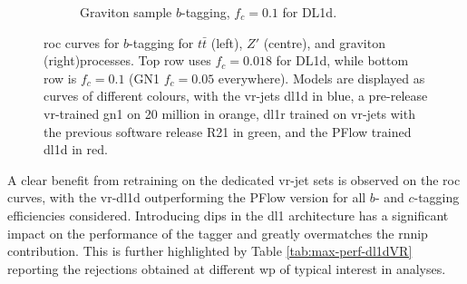 \begin{figure}
\begin{subfigure}[t]{0.3\textwidth}
    \caption{Graviton sample $b$-tagging, $f_c = 0.1$ for DL1d.}
    \label{fig:dl1dVRROCgrc}
  \end{subfigure}
  \caption{\gls{roc} curves for $b$-tagging for $t\bar{t}$ (left), $Z'$ (centre), and graviton (right)processes. Top row uses $f_c = 0.018$ for DL1d, while bottom row is $f_c = 0.1$ (GN1 $f_c = 0.05$ everywhere). Models are displayed as curves of different colours, with the \gls{vr}-jets \gls{dl1d} in blue, a pre-release \gls{vr}-trained \gls{gn1} on 20 million in orange, \gls{dl1r} trained on \gls{vr}-jets with the previous software release R21 in green, and the PFlow trained \gls{dl1d} in red.}
  \label{fig:dl1dVRROC}
\end{figure}

A clear benefit from retraining on the dedicated \gls{vr}-jet sets is observed on the \gls{roc} curves, with the \gls{vr}-\gls{dl1d} outperforming the PFlow version for all $b$- and $c$-tagging efficiencies considered. Introducing \gls{dips} in the \gls{dl1} architecture has a significant impact on the performance of the tagger and greatly overmatches the \gls{rnnip} contribution. This is further highlighted by Table \ref{tab:max-perf-dl1dVR} reporting the rejections obtained at different \gls{wp} of typical interest in analyses.

